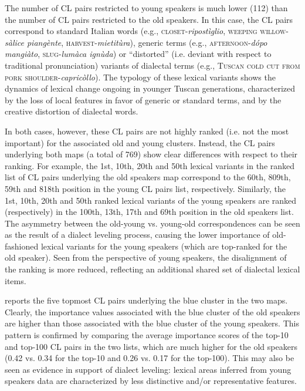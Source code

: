 \documentclass[output=paper]{LSP/langsci}
\begin{document}
The number of CL pairs restricted to young speakers is much lower (112) than the number of CL pairs restricted to the old speakers. In this case, the CL pairs correspond to standard Italian words (e.g., \textsc{closet}{}-\textit{ripostìglio}, \textsc{weeping willow}{}-\textit{sàlice piangènte}, \textsc{harvest}{}-\textit{mietitùra}), generic terms (e.g., \textsc{afternoon}{}-\textit{dópo mangiàto}, \textsc{slug}{}-\textit{lumàca ignùda}) or “distorted” (i.e. deviant with respect to traditional pronunciation) variants of dialectal terms (e.g., \textsc{Tuscan cold cut from pork shoulder}{}-\textit{capricòllo}). The typology of these lexical variants shows the dynamics of lexical change ongoing in younger Tuscan generations, characterized by the loss of local features in favor of generic or standard terms, and by the creative distortion of dialectal words. 

In both cases, however, these CL pairs are not highly ranked (i.e. not the most important) for the associated old and young clusters. Instead, the CL pairs underlying both maps (a total of 769) show clear differences with respect to their ranking. For example, the 1st, 10th, 20th and 50th lexical variants in the ranked list of CL pairs underlying the old speakers map correspond to the 60th, 809th, 59th and 818th position in the young CL pairs list, respectively. Similarly, the 1st, 10th, 20th and 50th ranked lexical variants of the young speakers are ranked (respectively) in the 100th, 13th, 17th and 69th position in the old speakers list. The asymmetry between the old-young vs. young-old correspondences can be seen as the result of a dialect leveling process, causing the lower importance of old-fashioned lexical variants for the young speakers (which are top-ranked for the old speaker). Seen from the perspective of young speakers, the disalignment of the ranking is more reduced, reflecting an additional shared set of dialectal lexical items.

 reports the five topmost CL pairs underlying the blue cluster in the two maps. Clearly, the importance values associated with the blue cluster of the old speakers are higher than those associated with the blue cluster of the young speakers. This pattern is confirmed by comparing the average importance scores of the top-10 and top-100 CL pairs in the two lists, which are much higher for the old speakers (0.42 vs. 0.34 for the top-10 and 0.26 vs. 0.17 for the top-100). This may also be seen as evidence in support of dialect leveling: lexical areas inferred from young speakers data are characterized by less distinctive and/or representative features. 
\end{document}
